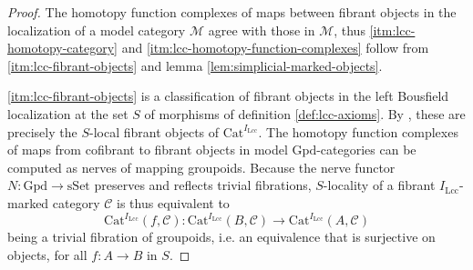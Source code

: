 \documentclass[a4paper]{article}
\theoremstyle{remark}
\theoremstyle{definition}
\begin{document}
\begin{proof}
  The homotopy function complexes of maps between fibrant objects in the localization of a model category $\mathcal{M}$ agree with those in $\mathcal{M}$, thus \ref{itm:lcc-homotopy-category} and \ref{itm:lcc-homotopy-function-complexes} follow from \ref{itm:lcc-fibrant-objects} and lemma \ref{lem:simplicial-marked-objects}.

  \ref{itm:lcc-fibrant-objects} is a classification of fibrant objects in the left Bousfield localization at the set $S$ of morphisms of definition \ref{def:lcc-axioms}.
  By \cite[Theorem 4.1.1]{hirschhorn}, these are precisely the $S$-local fibrant objects of $\mathrm{Cat}^{I_\mathrm{Lcc}}$.
  The homotopy function complexes of maps from cofibrant to fibrant objects in model $\mathrm{Gpd}$-categories can be computed as nerves of mapping groupoids.
  Because the nerve functor $N : \mathrm{Gpd} \rightarrow \mathrm{sSet}$ preserves and reflects trivial fibrations, $S$-locality of a fibrant $I_\mathrm{Lcc}$-marked category $\mathcal{C}$ is thus equivalent to 
  \begin{equation}
    \mathrm{Cat}^{I_\mathrm{Lcc}}(f, \mathcal{C}) : \mathrm{Cat}^{I_\mathrm{Lcc}}(B, \mathcal{C}) \rightarrow \mathrm{Cat}^{I_\mathrm{Lcc}}(A, \mathcal{C})
  \end{equation}
  being a trivial fibration of groupoids, i.e. an equivalence that is surjective on objects, for all $f : A \rightarrow B$ in $S$.
  

\end{proof}
\end{document}
